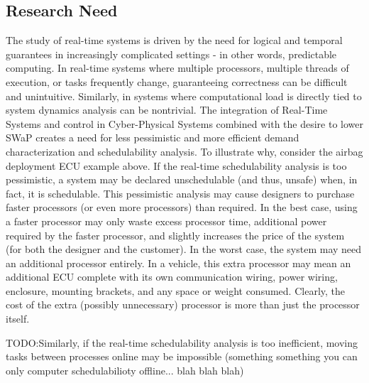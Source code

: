 \subsection{Research Need}
The study of real-time systems is driven by the need for logical and temporal guarantees in increasingly complicated settings - in other words, predictable computing.
In real-time systems where multiple processors, multiple threads of execution, or tasks frequently change, guaranteeing correctness can be difficult and unintuitive.
Similarly, in systems where computational load is directly tied to system dynamics analysis can be nontrivial.
The integration of Real-Time Systems and control in Cyber-Physical Systems combined with the desire to lower SWaP creates a need for less pessimistic and more efficient demand characterization and schedulability analysis.
To illustrate why, consider the airbag deployment ECU example above.
If the real-time schedulability analysis is too pessimistic, a system may be declared unschedulable (and thus, unsafe) when, in fact, it is schedulable.
This pessimistic analysis may cause designers to purchase faster processors (or even more processors) than required.
In the best case, using a faster processor may only waste excess processor time, additional power required by the faster processor, and slightly increases the price of the system (for both the designer and the customer).
In the worst case, the system may need an additional processor entirely.
In a vehicle, this extra processor may mean an additional ECU complete with its own communication wiring, power wiring, enclosure, mounting brackets, and any space or weight consumed.
Clearly, the cost of the extra (possibly unnecessary) processor is more than just the processor itself.

TODO:Similarly, if the real-time schedulability analysis is too inefficient, moving tasks between processes online may be impossible (something something you can only computer schedulabilioty offline... blah blah blah)

